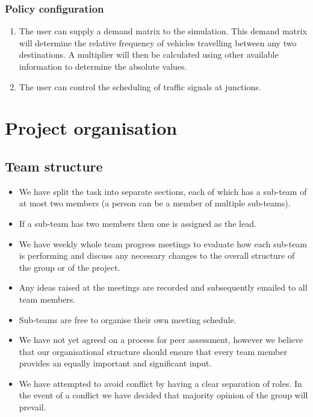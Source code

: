 \documentclass[11pt]{article}
\begin{document}
	\subsubsection{Policy configuration}
	
	\begin{enumerate}
		\item The user can supply a demand matrix to the simulation. This demand matrix will determine the relative frequency of vehicles travelling between any two destinations. A multiplier will then be calculated using other available information to determine the absolute values.
		\item The user can control the scheduling of traffic signals at junctions.
	\end{enumerate}
	
	\section{Project organisation}
	\subsection{Team structure}
	
	\begin{itemize}
		\item We have split the task into separate sections, each of which has a sub-team of at most two members (a person can be a member of multiple sub-teams).
		\item If a sub-team has two members then one is assigned as the lead.
		\item We have weekly whole team progress meetings to evaluate how each sub-team is performing and discuss any necessary changes to the overall structure of the group or of the project.
		\item Any ideas raised at the meetings are recorded and subsequently emailed to all team members.
		\item Sub-teams are free to organise their own meeting schedule.
		\item We have not yet agreed on a process for peer assessment, however we believe that our organisational structure should ensure that every team member provides an equally important and significant input.
		\item We have attempted to avoid conflict by having a clear separation of roles. In the event of a conflict we have decided that majority opinion of the group will prevail.
	\end{itemize}



\end{document}
